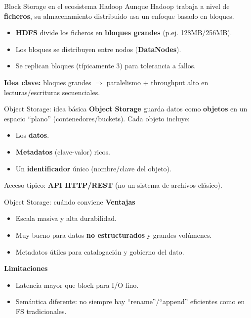 \documentclass{beamer}
\begin{document}
\begin{frame}{Block Storage en el ecosistema Hadoop}
Aunque Hadoop trabaja a nivel de \textbf{ficheros}, su almacenamiento distribuido usa un enfoque basado en bloques.

\begin{itemize}
    \item \textbf{HDFS} divide los ficheros en \textbf{bloques grandes} (p.ej. 128MB/256MB).
    \item Los bloques se distribuyen entre nodos (\textbf{DataNodes}).
    \item Se replican bloques (típicamente 3) para tolerancia a fallos.
\end{itemize}

\medskip
\textbf{Idea clave:} bloques grandes $\Rightarrow$ paralelismo + throughput alto en lecturas/escrituras secuenciales.
\end{frame}

\begin{frame}{Object Storage: idea básica}
\textbf{Object Storage} guarda datos como \textbf{objetos} en un espacio “plano” (contenedores/buckets).
Cada objeto incluye:
\begin{itemize}
    \item Los \textbf{datos}.
    \item \textbf{Metadatos} (clave-valor) ricos.
    \item Un \textbf{identificador} único (nombre/clave del objeto).
\end{itemize}

Acceso típico: \textbf{API HTTP/REST} (no un sistema de archivos clásico).
\end{frame}

\begin{frame}{Object Storage: cuándo conviene}
\textbf{Ventajas}
\begin{itemize}
    \item Escala masiva y alta durabilidad.
    \item Muy bueno para datos \textbf{no estructurados} y grandes volúmenes.
    \item Metadatos útiles para catalogación y gobierno del dato.
\end{itemize}

\textbf{Limitaciones}
\begin{itemize}
    \item Latencia mayor que block para I/O fino.
    \item Semántica diferente: no siempre hay “rename”/“append” eficientes como en FS tradicionales.
\end{itemize}
\end{frame}
\end{document}
